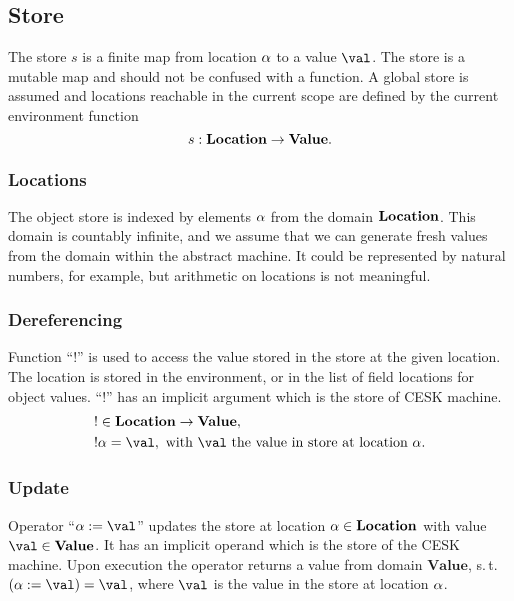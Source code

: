 \documentclass[a4paper,oneside,fleqn]{article}
\newcommand{\dval}{\mathbf{Value}}
\begin{document}
\subsection{Store}
\label{subsec:store-definition}

The store $s$ is a finite map from location $\alpha$ to a value $\val$.
The store is a mutable map and should not be confused with a function.
A global store is assumed and locations reachable in the current scope are defined by the current environment function
\[
    s : \dlocation \rightarrow \dval.
\]


\subsubsection{Locations}

The object store is indexed by elements $\alpha$ from the domain $\mathbf{Location}$.
This domain is countably infinite, and we assume that we can generate fresh values from the domain within the abstract machine.
It could be represented by natural numbers, for example, but arithmetic on locations is not meaningful.


\subsubsection{Dereferencing}
\label{subsubsection:dereferecing}

\newcommand{\deref}[1]{!#1}
Function ``$\deref{}$'' is used to access the value stored in the store at the given location.
The location is stored in the environment, or in the list of field locations for object values.
``$\deref{}$'' has an implicit argument which is the store of CESK machine.
\begin{align*}
    &\deref{} \in \dlocation \rightarrow \dval,\\
    &\deref{\loc} =  \val, \text{ with $\val$ the value in store at location } \loc.
\end{align*}


\subsubsection{Update}
\label{subsubsec:store-update}

\newcommand{\update}[2]{{#1} := {#2}}
Operator ``$\update{\loc}{\val}$'' updates the store at location $\alpha \in \mathbf{Location}$ with value $\val \in \dval$.
It has an implicit operand which is the store of the CESK machine.
Upon execution the operator returns a value from domain $\dval$, s.\,t. $(\update{\loc}{\val}) = \val$, where $\val$ is the value in the store at location $\alpha$.
\end{document}
